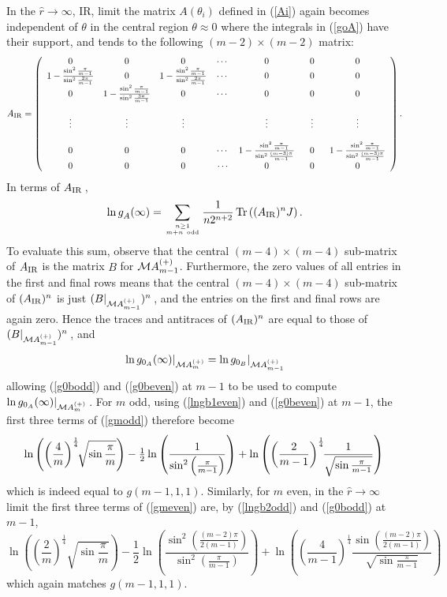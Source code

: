 \documentclass[11pt]{article}
\newcommand\phup{^{\phantom o}}
\newcommand{\CM}{{\cal M}}
\newcommand\beq{\begin{equation}}
\newcommand\eeq{\end{equation}}
\newcommand\nn{\nonumber}
\newcommand\half{{\textstyle\frac{1}{2}}}
\newcommand{\te}{\theta}
\newcommand{\goA}{g\phup_{A}}
\begin{document}
In the $\hat r\to\infty$, IR, limit
the matrix $A(\te_i)$ defined in (\ref{Ai}) again becomes independent
of $\te$ in the central region $\te\approx 0$ where the integrals in
(\ref{goA}) have their support, and tends to the following 
$(m{-}2)\times (m{-}2)$ matrix:
\beq
A_{\rm IR}=
\left(\begin{array}{cccccccc}
0&0&0&\cdots&0&0&0\\
1-\frac{\sin^2\frac{\pi}{m-1}}{\sin^2\frac{2\pi}{m-1}}&0
&1-\frac{\sin^2\frac{\pi}{m-1}}{\sin^2\frac{2\pi}{m-1}}&\cdots&0&0&0\\
0&1-\frac{\sin^2\frac{\pi}{m-1}}{\sin^2\frac{3\pi}{m-1}}
&0&\cdots&0&0&0\\
&&&&&&\\
\vdots&\vdots&\vdots&&\vdots&\vdots&\vdots\\
&&&&&&\\
0&0&0&\cdots&1-\frac{\sin^2\frac{\pi}{m-1}}{\sin^2\frac{(m-3)\pi}{m-1}}
&0&1-\frac{\sin^2\frac{\pi}{m-1}}{\sin^2\frac{(m-3)\pi}{m-1}}\\
0&0&0&\,\cdots\,&0&~~0~~&0
\end{array}\right).\eeq
In terms of $A_{\rm IR}$\,,
\beq
\ln\goA(\infty)=\sum_{n\ge 1\atop m+n~{\rm odd}}
\frac{1}{n2^{n+2}}\,\mbox{Tr}\left((A_{\rm IR})^nJ\right).
\eeq
To evaluate this sum, observe that the central $(m{-}4)\times(m{-}4)$
sub-matrix of $A_{\rm IR}$ is the matrix $B$ for $\CM A^{(+)}_{m-1}$.
Furthermore, the zero values of all entries in the first and final
rows means that the central $(m{-}4)\times(m{-}4)$ sub-matrix of 
$(A_{\rm IR})^n$ is just 
$(B|_{\CM A^{(+)}_{m-1}})^n$\,, 
and the entries on the first and final rows are again zero.
Hence the traces and antitraces of $(A_{\rm IR})^n$ are equal to those
of $(B|_{\CM A^{(+)}_{m-1}})^n$\,, and 
\beq
\ln g_{0_A}(\infty)|_{\CM A^{(+)}_{m}}=\ln g_{0_B}|_{\CM A^{(+)}_{m-1}}
\eeq
allowing (\ref{g0bodd}) and (\ref{g0beven}) at $m{-}1$
to be used to compute
$\ln g_{0_A}(\infty)|_{\CM A^{(+)}_{m}}$\,.
For $m$ odd, using (\ref{lngb1even}) and
(\ref{g0beven}) at $m{-}1$,
the first three terms of (\ref{gmodd}) therefore become
\beq
\ln\left(\left(\frac{4}{m}\right)^{\frac{1}{4}}\!\!
\sqrt{\sin{\frac{\pi}{m}}}\right)
-\half\ln\left(\frac{1}{\sin^2\left(\frac{\pi}{m-1}\right)}\right)
+ \ln\left(\left(\frac{2}{m-1}\right)^{\frac{1}{4}}\!\!
\frac{1}{\sqrt{\sin{\frac{\pi}{m-1}}}}\right)
\nn\\
\eeq
which is indeed equal to $g(m{-}1,1,1)$. 
Similarly, for $m$ even, in the $\hat r\to\infty$ limit 
the first three terms of (\ref{gmeven}) are, by 
(\ref{lngb2odd}) and (\ref{g0bodd}) at $m{-}1$,
\beq
\ln\left(\left(\frac{2}{m}\right)^{\frac{1}{4}}\!\!
\sqrt{\sin{\frac{\pi}{m}}}\right)
-\half\ln\left(\frac{\sin^2\left(\frac{(m-2)\pi}{2(m-1)}
\right)}{\sin^2\left(\frac{\pi}{m-1}\right)}\right)
+\ln\left(\left(\frac{4}{m-1}\right)^{\frac{1}{4}}
\frac{\sin\left(\frac{(m-2)\pi}{2(m-1)}\right)}%
{\sqrt{\sin{\frac{\pi}{m-1}}}}\right)
\eeq
which again matches $g(m{-}1,1,1)$.
\end{document}
